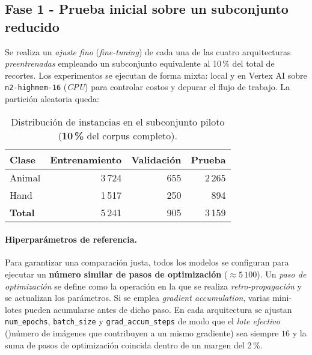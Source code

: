 \subsection*{Fase 1 - Prueba inicial sobre un subconjunto reducido}

Se realiza un \emph{ajuste fino} (\emph{fine-tuning}) de cada una de las cuatro arquitecturas \emph{preentrenadas} empleando un subconjunto equivalente al 10\,\% del total de recortes.
Los experimentos se ejecutan de forma mixta: local y en Vertex AI sobre \texttt{n2-highmem-16} (\emph{CPU}) para controlar costos y depurar el flujo de trabajo.
La partición aleatoria queda:

\begin{table}[htpb]
    \centering
    \begin{tabular}{l r r r}
        \hline
        \textbf{Clase} & \textbf{Entrenamiento} & \textbf{Validación} & \textbf{Prueba} \\
        \hline
        Animal & 3\,724 & 655 & 2\,265 \\
        Hand   & 1\,517 & 250 &   894 \\
        \hline
        \textbf{Total} & 5\,241 & 905 & 3\,159 \\
    \end{tabular}
    \caption{Distribución de instancias en el subconjunto piloto (\textbf{10\,\%} del corpus completo).}
    \label{tab:pilot_split}
\end{table}

\paragraph{Hiperparámetros de referencia.}
Para garantizar una comparación justa, todos los modelos se configuran para ejecutar un \textbf{número similar de pasos de optimización} (\(\approx 5\,100\)).
Un \emph{paso de optimización} se define como la operación en la que se realiza \emph{retro-propagación} y se actualizan los parámetros.
Si se emplea \textit{gradient accumulation}, varias mini-lotes pueden acumularse antes de dicho paso.
En cada arquitectura se ajustan \texttt{num\_epochs}, \texttt{batch\_size} y \texttt{grad\_accum\_steps} de modo que el \emph{lote efectivo} ()número de imágenes que contribuyen a un mismo gradiente) sea siempre \(16\) y la suma de pasos de optimización coincida dentro de un margen del 2\,\%.

